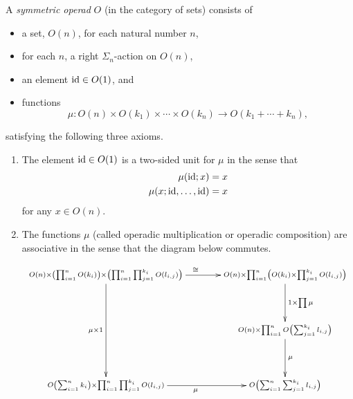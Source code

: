 \begin{Defi}
A \textit{symmetric operad} $O$ (in the category of sets) consists of
\begin{itemize}
\item a set, $O(n)$, for each natural number $n$,
\item for each $n$, a right $\Sigma_{n}$-action on $O(n)$,
\item an element $\textrm{id} \in O(1)$, and
\item functions
  \[
    \mu \colon  O(n) \times O(k_{1}) \times \cdots \times O(k_{n}) \rightarrow O(k_{1} + \cdots + k_{n}),
  \]
\end{itemize}
satisfying the following three axioms.
\begin{enumerate}
\item The element $\textrm{id} \in O(1)$ is a two-sided unit for $\mu$ in the sense that
  \begin{align*}
    \mu(\textrm{id};x) &= x\\
    \mu(x;\textrm{id},\ldots,\textrm{id}) &= x
  \end{align*}
for any $x \in O(n)$.
\item The functions $\mu$ (called operadic multiplication or operadic composition) are associative in the sense that the diagram below commutes.


  \[
    \xy
      (0,0)*+{\scriptstyle O(n) \times \left(\prod_{i=1}^n O(k_i)\right) \times \left(\prod_{i=1}^n\prod_{j=1}^{k_i} O(l_{i,j})\right)}="a";
      (65,0)*+{\scriptstyle O(n) \times \prod_{i=1}^n \left(O(k_i) \times \prod_{j=1}^{k_i} O(l_{i,j})\right)}="b";
      (65,-20)*+{\scriptstyle O(n) \times \prod_{i=1}^n O\left(\sum_{j=1}^{k_i} l_{i,j}\right)}="c";
      (65,-40)*+{\scriptstyle O\left(\sum_{i=1}^n \sum_{j=1}^{k_i} l_{i,j}\right)}="d";
      (0,-40)*+{\scriptstyle O\left(\sum_{i=1}^n k_i\right) \times \prod_{i=1}^n \prod_{j=1}^{k_i} O(l_{i,j})}="e";
      {\ar^{\cong} "a" ; "b"};
      {\ar^{1 \times \prod \mu} "b" ; "c"};
      {\ar^{\mu} "c" ; "d"};
      {\ar_{\mu \times 1} "a" ; "e"};
      {\ar_{\mu} "e" ; "d"};
    \endxy
  \]


\end{enumerate}
\end{Defi}
